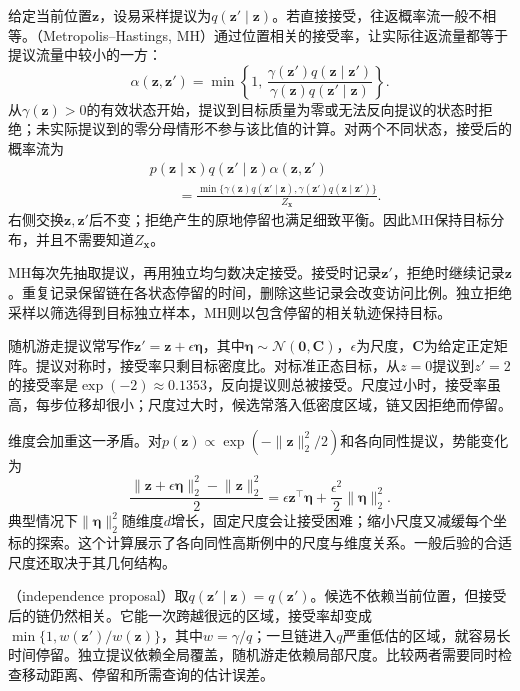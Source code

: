 给定当前位置$\bm{z}$，设易采样提议为$q(\bm{z}'\mid\bm{z})$。若直接接受，往返概率流一般不相等。（Metropolis--Hastings, MH）通过位置相关的接受率，让实际往返流量都等于提议流量中较小的一方：
\begin{equation}
  \alpha(\bm{z},\bm{z}')
    =\min\left\{1,\,
      \frac{\gamma(\bm{z}')q(\bm{z}\mid\bm{z}')}
           {\gamma(\bm{z})q(\bm{z}'\mid\bm{z})}\right\}.
  \label{eq:pgm-sampling-mh-acceptance}
\end{equation}
从$\gamma(\bm{z})>0$的有效状态开始，提议到目标质量为零或无法反向提议的状态时拒绝；未实际提议到的零分母情形不参与该比值的计算。对两个不同状态，接受后的概率流为
\[
  \begin{aligned}
    &p(\bm{z}\mid\bm{x})q(\bm{z}'\mid\bm{z})\alpha(\bm{z},\bm{z}')\\
    &\qquad=\frac{\min\{\gamma(\bm{z})q(\bm{z}'\mid\bm{z}),
                    \gamma(\bm{z}')q(\bm{z}\mid\bm{z}')\}}
         {Z_{\bm{x}}}.
  \end{aligned}
\]
右侧交换$\bm{z},\bm{z}'$后不变；拒绝产生的原地停留也满足细致平衡。因此MH保持目标分布，并且不需要知道$Z_{\bm{x}}$。

MH每次先抽取提议，再用独立均匀数决定接受。接受时记录$\bm{z}'$，拒绝时继续记录$\bm{z}$。重复记录保留链在各状态停留的时间，删除这些记录会改变访问比例。独立拒绝采样以筛选得到目标独立样本，MH则以包含停留的相关轨迹保持目标。

随机游走提议常写作$\bm{z}'=\bm{z}+\epsilon\bm{\eta}$，其中$\bm{\eta}\sim\mathcal{N}(\bm{0},\bm{C})$，$\epsilon$为尺度，$\bm{C}$为给定正定矩阵。提议对称时，接受率只剩目标密度比。对标准正态目标，从$z=0$提议到$z'=2$的接受率是$\exp(-2)\approx0.1353$，反向提议则总被接受。尺度过小时，接受率虽高，每步位移却很小；尺度过大时，候选常落入低密度区域，链又因拒绝而停留。

维度会加重这一矛盾。对$p(\bm{z})\propto\exp(-\lVert\bm{z}\rVert_2^2/2)$和各向同性提议，势能变化为
\[
  \frac{\lVert\bm{z}+\epsilon\bm{\eta}\rVert_2^2
             -\lVert\bm{z}\rVert_2^2}{2}
    =\epsilon\bm{z}^{\top}\bm{\eta}
       +\frac{\epsilon^2}{2}\lVert\bm{\eta}\rVert_2^2.
\]
典型情况下$\lVert\bm{\eta}\rVert_2^2$随维度$d$增长，固定尺度会让接受困难；缩小尺度又减缓每个坐标的探索。这个计算展示了各向同性高斯例中的尺度与维度关系。一般后验的合适尺度还取决于其几何结构。

（independence proposal）取$q(\bm{z}'\mid\bm{z})=q(\bm{z}')$。候选不依赖当前位置，但接受后的链仍然相关。它能一次跨越很远的区域，接受率却变成$\min\{1,w(\bm{z}')/w(\bm{z})\}$，其中$w=\gamma/q$；一旦链进入$q$严重低估的区域，就容易长时间停留。独立提议依赖全局覆盖，随机游走依赖局部尺度。比较两者需要同时检查移动距离、停留和所需查询的估计误差。

